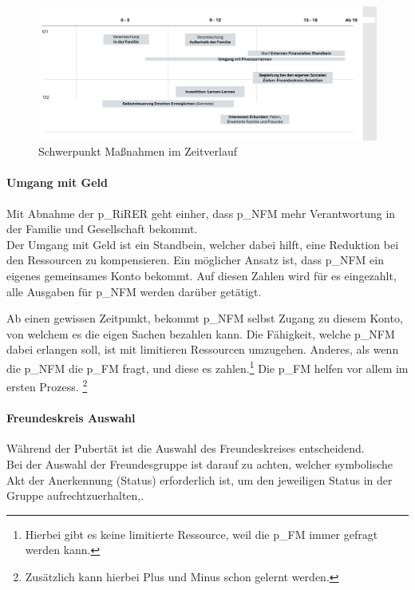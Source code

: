 \begin{figure}[H]
	\centering
	\includegraphics[scale = 0.3]{attachment/chapter_OWN/Scc008.png}
	\caption{Schwerpunkt Maßnahmen im Zeitverlauf}
\end{figure}

\paragraph{Umgang mit Geld}
Mit Abnahme der \gls{p_RiRER} geht einher, dass \gls{p_NFM} mehr Verantwortung in der Familie und Gesellschaft bekommt.\\


Der Umgang mit Geld ist ein Standbein, welcher dabei hilft, eine Reduktion bei den Ressourcen zu kompensieren. Ein möglicher Ansatz ist, dass \gls{p_NFM} ein eigenes gemeinsames Konto bekommt. Auf diesen Zahlen wird für es eingezahlt, alle Ausgaben für \gls{p_NFM} werden darüber getätigt.

Ab einen gewissen Zeitpunkt, bekommt \gls{p_NFM} selbst Zugang zu diesem Konto, von welchem es die eigen Sachen bezahlen kann. Die Fähigkeit, welche \gls{p_NFM} dabei erlangen soll, ist mit limitieren Ressourcen umzugehen. Anderes, als wenn die \gls{p_NFM} die \gls{p_FM} fragt, und diese es zahlen.\footnote{
	Hierbei gibt es keine limitierte Ressource, weil die \gls{p_FM} immer gefragt werden kann.
} Die \gls{p_FM} helfen vor allem im ersten Prozess. \footnote{
	Zusätzlich kann hierbei Plus und Minus schon gelernt werden.
}

\paragraph{Freundeskreis Auswahl}

Während der Pubertät ist die Auswahl des Freundeskreises entscheidend.\\


Bei der Auswahl der Freundesgruppe ist darauf zu achten, welcher symbolische Akt der Anerkennung (Status) erforderlich ist, um den jeweiligen Status in der Gruppe aufrechtzuerhalten,.\\



